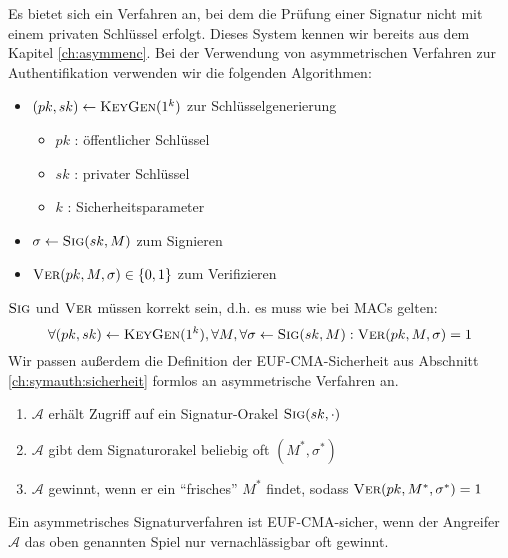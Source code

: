 Es bietet sich ein Verfahren an, bei dem die Prüfung einer Signatur nicht mit einem privaten Schlüssel erfolgt. Dieses System kennen wir bereits aus dem Kapitel
\ref{ch:asymmenc}. Bei der Verwendung von asymmetrischen Verfahren zur Authentifikation verwenden wir die folgenden Algorithmen:
\begin{itemize}
  \item $(pk, sk) \leftarrow \textsc{KeyGen}(1^k)$ zur Schlüsselgenerierung
    \begin{itemize}
      \item $pk$ : öffentlicher Schlüssel
      \item $sk$ : privater Schlüssel
      \item $k$ : Sicherheitsparameter
    \end{itemize}
  \item $\sigma \leftarrow \textsc{Sig}(sk,M)$ zum Signieren
  \item $\textsc{Ver}(pk,M,\sigma) \in \{ 0,1 \}$ zum Verifizieren
\end{itemize}
$\textsc{Sig}$ und $\textsc{Ver}$ müssen korrekt sein, d.h. es muss wie bei MACs gelten:
\begin{equation*}
    \forall (pk,sk) \leftarrow \textsc{KeyGen}(1^k), \forall M, \forall \sigma \leftarrow \textsc{Sig}(sk,M) : \textsc{Ver}(pk,M,\sigma) = 1
\end{equation*}
Wir passen außerdem die Definition der EUF-CMA-Sicherheit aus Abschnitt \ref{ch:symauth:sicherheit} formlos an asymmetrische Verfahren an.
\begin{enumerate}
  \item $\mathcal{A}$ erhält Zugriff auf ein Signatur-Orakel $\textsc{Sig}(sk,\cdot)$
  \item $\mathcal{A}$ gibt dem Signaturorakel beliebig oft $(M^*, \sigma^*)$
  \item $\mathcal{A}$ gewinnt, wenn er ein "`frisches"' $M^*$ findet, sodass $\textsc{Ver}(pk,M^*,\sigma^*) = 1$
\end{enumerate}
Ein asymmetrisches Signaturverfahren ist EUF-CMA-sicher, wenn der Angreifer $\mathcal{A}$ das oben genannten Spiel nur vernachlässigbar oft gewinnt. 

